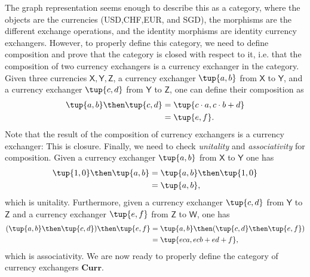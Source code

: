 \begin{remark}
The graph representation seems enough to describe this as a category, where the objects are the currencies (USD,CHF,EUR, and SGD), the morphisms are the different exchange operations, and the identity morphisms are identity currency exchangers. However, to properly define this category, we need to define composition and prove that the category is closed with respect to it, i.e. that the composition of two currency exchangers is a currency exchanger in the category. Given three currencies $\mathsf{X,Y,Z}$, a currency exchanger $\tup{a,b}$ from $\mathsf{X}$ to $\mathsf{Y}$, and a currency exchanger $\tup{c,d}$ from $\mathsf{Y}$ to $\mathsf{Z}$, one can define their composition as
\begin{equation}
\begin{aligned}
\label{eq:currencycomp}
    \tup{a,b}\then \tup{c,d}&=\tup{c\cdot a,c\cdot b+d}\\
    &=\tup{e,f}.
\end{aligned}
\end{equation}
Note that the result of the composition of currency exchangers is a currency exchanger: This is closure. Finally, we need to check \emph{unitality} and \emph{associativity} for composition. Given a currency exchanger $\tup{a,b}$ from $\mathsf{X}$ to $\mathsf{Y}$ one has
\begin{equation}
    \begin{aligned}
    \tup{1,0}\then \tup{a,b}&=\tup{a,b}\then \tup{1,0}\\
    &=\tup{a,b},
    \end{aligned}
\end{equation}
which is unitality. Furthermore, given a currency exchanger $\tup{c,d}$ from $\mathsf{Y}$ to $\mathsf{Z}$ and a currency exchanger $\tup{e,f}$ from $\mathsf{Z}$ to $\mathsf{W}$, one has
\begin{equation}
    \begin{aligned}
    (\tup{a,b}\then \tup{c,d})\then \tup{e,f}&=\tup{a,b}\then( \tup{c,d}\then \tup{e,f})\\
    &=\tup{eca, ecb+ed+f},
    \end{aligned}
\end{equation}
which is associativity.
We are now ready to properly define the category of currency exchangers $\mathbf{Curr}$.


\end{remark}
